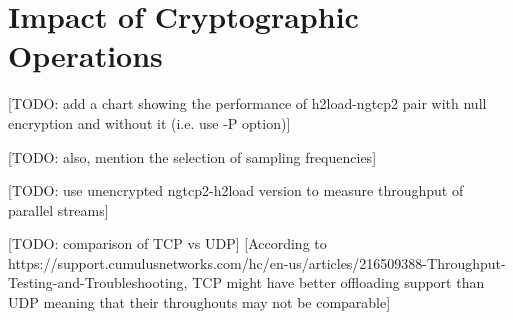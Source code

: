 \documentclass[12pt,a4paper,twoside,openright]{report}
\begin{document}
\section{Impact of Cryptographic Operations}



[TODO: add a chart showing the performance of h2load-ngtcp2 pair with null encryption and without it (i.e. use -P option)]

[TODO: also, mention the selection of sampling frequencies]

[TODO: use unencrypted ngtcp2-h2load version to measure throughput of parallel streams]





[TODO: comparison of TCP vs UDP]
[According to https://support.cumulusnetworks.com/hc/en-us/articles/216509388-Throughput-Testing-and-Troubleshooting, TCP might have better offloading support than UDP meaning that their throughouts may not be comparable]
\end{document}
